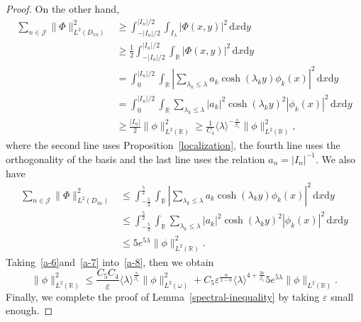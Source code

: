 \documentclass{amsart}
\renewcommand{\d}{\,\mathrm{d}}
\newcommand\R{\ensuremath{\mathbb{R}}}
\theoremstyle{definition}
\begin{document}
\begin{proof}
On the other hand, 
\begin{equation}\label{a-6}
	\begin{aligned}
	\sum_{n\in \mathcal{J}}\|\Phi\|^2_{L^2(D_{1n})} &\ge \int_{-|I_n| /2}^{|I_n| /2} \int_{I_{\lambda}}|\Phi(x,y)|^2 \d x\mathrm{d}y\\
							&\ge \frac{1}{2}\int_{-|I_n| /2}^{|I_n| /2}\int_{\R}|\Phi(x,y)|^2\d x \mathrm{d}y\\
							&=\int_0^{|I_n| /2}\int_{\R}|\sum_{\lambda_k\le \lambda}a_k\cosh(\lambda_k y)\phi_k(x)|^2\d x \mathrm{d}y\\
							&=\int_0^{|I_n| /2} \int_{\R}\sum_{\lambda_k\le \lambda}|a_k|^2\cosh(\lambda_ky)^2|\phi_k(x)|^2\d x \mathrm{d}y\\
							&\ge \frac{|I_n|}{2}\|\phi\|^2_{L^2(\R)}\ge \frac{1}{C_4}\langle \lambda\rangle ^{-\frac{s}{\beta_1}} \|\phi\|^2_{L^2(\R)}
,
\end{aligned}
\end{equation}
where the second line uses Proposition~\ref{localization}, the fourth line uses the orthogonality of the basis and the last line uses the relation $a_n=|I_n|^{-1}$. We also have
\begin{equation}\label{a-7}
	\begin{aligned}
		\sum_{n\in \mathcal{J}}\|\Phi\|^2_{L^2(D_{3n})}&\le\int_{- \frac{5}{2}}^{\frac{5}{2}}\int_{\R} |\sum_{\lambda_k\le\lambda}a_k\cosh(\lambda_k y)\phi_k(x)|^2\d x \mathrm{d}y\\
							       &\le\int_{-\frac{5}{2}}^{\frac{5}{2}} \int_{\R}\sum_{\lambda_k\le \lambda}|a_k|^2\cosh(\lambda_ky)^2|\phi_k(x)|^2\d x \mathrm{d}y\\ 
							       &\le 5 e^{5 \lambda}\|\phi\|^2_{L^2(\R)}.
	\end{aligned}
\end{equation}
Taking~\eqref{a-6}and~\eqref{a-7} into~\eqref{a-8}, then we obtain
\begin{equation}
	\|\phi\|^2_{L^2(\R)} \le \frac{C_5C_4}{\varepsilon }\langle \lambda\rangle ^{\frac{s}{\beta_1}}\|\phi\|^2_{L^2(\omega)}+C_5 \varepsilon ^{\frac{\alpha}{1-\alpha}}\langle \lambda\rangle ^{4+\frac{3s}{\beta_1}}5e^{5 \lambda}\|\phi\|_{L^2(\R)}. 
\end{equation}
Finally, we complete the proof of Lemma~\ref{spectral-inequality} by taking $\varepsilon $ small enough.
\end{proof}


\appendix
\end{document}
